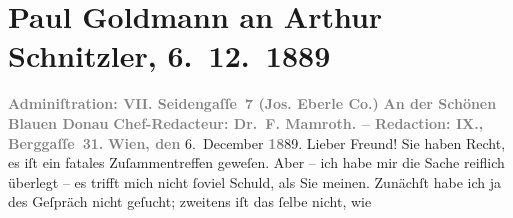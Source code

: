 

         
         \renewcommand{\erwaehntePersonen}{Personen:  ?? [Frau, die mit Goldmann in der Straßenbahn spricht, Ende November 1889],  ?? [Mann, der Gespräch über Schnitzler in der Straßenbahn belauscht, Ende November 1889], Fedor Mamroth}
         \renewcommand{\erwaehnteInstitutionen}{Institutionen: An der schönen blauen Donau, Josef Eberle Stein-, Buch und Musikaliendruckerei}
         \renewcommand{\erwaehnteOrte}{Orte: Berggasse, Seidengasse, Wien}
         \renewcommand{\erwaehnteWerke}{}
               \section[Paul Goldmann an Arthur Schnitzler, 6. 12. 1889]{ Paul Goldmann an Arthur Schnitzler, 6. 12. 1889}\nopagebreak{}\rehead{ }\begin{ledgroupsized}[t]{13cm}\normalsize\beginnumbering \toendnotes[C]{\smallbreak\pagebreak[2]} 
\toendnotes[C]{\smallbreak}\pstart
           \noindent{}\centering{}{\pb}\textcolor{gray}{\textbf{\textbf{Adminiſtration: VII.
                           Seidengaſſe 7} (Jos. Eberle {\kaufmannsund} Co.)}}\pend
           \pstart
           \noindent{}\centering{}\textcolor{gray}{\textbf{An der Schönen Blauen Donau}}\pend
           \pstart
           \noindent{}\centering{}\textcolor{gray}{\textbf{Chef-Redacteur: Dr. F.
                        Mamroth. – Redaction: IX.,
                        Berggaſſe 31.}}\pend
           \pstart
           \raggedleft{}\textcolor{gray}{\textbf{Wien, den}}{ }6. December \textcolor{gray}{\textbf{18}}89.\pend
           \pstart\center{}Lieber Freund!\pend\pstart
           Sie haben Recht, es iſt ein fatales Zuſammentreffen geweſen. Aber – ich habe mir die
               Sache reiflich überlegt – es trifft mich nicht ſoviel Schuld, als Sie meinen.
               Zunächſt habe ich ja des Geſpräch nicht geſucht; zweitens iſt das ſelbe nicht, wie

\end{ledgroupsized}
